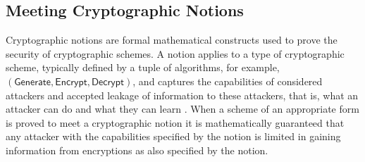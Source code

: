 \subsection{Meeting Cryptographic Notions}\label{subsec:prelims:crypto_notions}
Cryptographic notions are formal mathematical constructs used to prove the security of cryptographic schemes. A notion applies to a type of cryptographic scheme, typically defined by a tuple of algorithms, for example, $(\mathsf{Generate},\mathsf{Encrypt},\mathsf{Decrypt})$, and captures the capabilities of considered attackers and accepted leakage of information to these attackers, that is, what an attacker can do and what they can learn \cite{katzIntroductionModernCryptography2008}. When a scheme of an appropriate form is proved to meet a cryptographic notion it is mathematically guaranteed that any attacker with the capabilities specified by the notion is limited in gaining information from encryptions as also specified by the notion.

